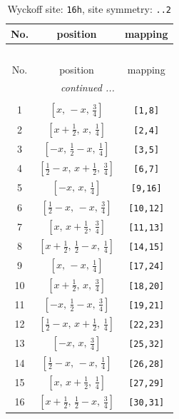 \documentclass[fleqn,8pt]{jsarticle}
\begin{document}
\renewcommand{\arraystretch}{1.2}
\begin{longtable}{ccc}
\caption{Wyckoff site: {\tt 16h}, site symmetry: {\tt ..2}}
 \\
 \hline \hline
No. & position & mapping \\ \hline \endfirsthead

\multicolumn{2}{l}{\tablename\ \thetable{}} \\
 \hline \hline
No. & position & mapping \\ \hline \endhead

 \hline \hline
\multicolumn{2}{r}{\footnotesize\it continued ...} \\ \endfoot

 \hline \hline
\multicolumn{2}{r}{} \\ \endlastfoot

1 & $\left[ x,\, - x,\, \frac{3}{4} \right]$ & {\tt [1,8]} \\ \hline
2 & $\left[ x + \frac{1}{2},\, x,\, \frac{1}{4} \right]$ & {\tt [2,4]} \\ \hline
3 & $\left[ - x,\, \frac{1}{2} - x,\, \frac{1}{4} \right]$ & {\tt [3,5]} \\ \hline
4 & $\left[ \frac{1}{2} - x,\, x + \frac{1}{2},\, \frac{3}{4} \right]$ & {\tt [6,7]} \\ \hline
5 & $\left[ - x,\, x,\, \frac{1}{4} \right]$ & {\tt [9,16]} \\ \hline
6 & $\left[ \frac{1}{2} - x,\, - x,\, \frac{3}{4} \right]$ & {\tt [10,12]} \\ \hline
7 & $\left[ x,\, x + \frac{1}{2},\, \frac{3}{4} \right]$ & {\tt [11,13]} \\ \hline
8 & $\left[ x + \frac{1}{2},\, \frac{1}{2} - x,\, \frac{1}{4} \right]$ & {\tt [14,15]} \\ \hline
9 & $\left[ x,\, - x,\, \frac{1}{4} \right]$ & {\tt [17,24]} \\ \hline
10 & $\left[ x + \frac{1}{2},\, x,\, \frac{3}{4} \right]$ & {\tt [18,20]} \\ \hline
11 & $\left[ - x,\, \frac{1}{2} - x,\, \frac{3}{4} \right]$ & {\tt [19,21]} \\ \hline
12 & $\left[ \frac{1}{2} - x,\, x + \frac{1}{2},\, \frac{1}{4} \right]$ & {\tt [22,23]} \\ \hline
13 & $\left[ - x,\, x,\, \frac{3}{4} \right]$ & {\tt [25,32]} \\ \hline
14 & $\left[ \frac{1}{2} - x,\, - x,\, \frac{1}{4} \right]$ & {\tt [26,28]} \\ \hline
15 & $\left[ x,\, x + \frac{1}{2},\, \frac{1}{4} \right]$ & {\tt [27,29]} \\ \hline
16 & $\left[ x + \frac{1}{2},\, \frac{1}{2} - x,\, \frac{3}{4} \right]$ & {\tt [30,31]} \\
\end{longtable}
\end{document}
